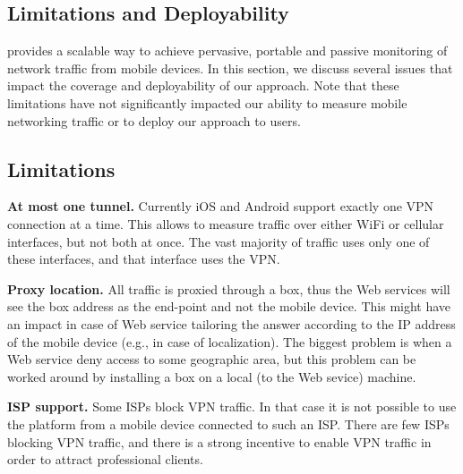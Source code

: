 


\subsection{Limitations and Deployability}
\label{sec:addit-limit}

\platname{} provides a scalable way to achieve pervasive, portable 
and passive monitoring of network traffic from mobile devices. In 
this section, we discuss several issues that impact the coverage 
and deployability of our approach. Note that these limitations have 
not significantly impacted our ability to measure mobile networking 
traffic or to deploy our approach to users.

\subsection{Limitations}


\noindent\textbf{At most one tunnel.} Currently iOS and Android 
support exactly one VPN connection at a time. This allows \platname{} 
to measure traffic over either WiFi or cellular interfaces, but not both at once. 
The vast majority of traffic uses only one of these interfaces, 
and that interface uses the VPN.

\noindent\textbf{Proxy location.} All traffic is proxied through a \platname{} box, thus the Web
services will see the \platname{} box address as the end-point and not
the mobile device. This might have an impact in case of Web service
tailoring the answer according to the IP address of the mobile device
(e.g., in case of localization). The biggest problem is when a Web
service deny access to some geographic area, but this problem can be
worked around by installing a \platname{} box on a local (to the Web
sevice) machine.

\noindent\textbf{ISP support.} Some ISPs block VPN traffic. In that case it is not possible
to use the \platname{} platform from a mobile device connected to
such an ISP. There are few ISPs blocking VPN traffic, and there is a
strong incentive to enable VPN traffic in order to attract
professional clients. 

